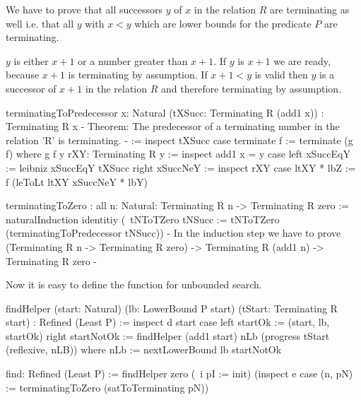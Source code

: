 We have to prove that all successors $y$ of $x$ in the relation $R$ are
terminating as well i.e. that all $y$ with $x < y$ which are lower bounds for
the predicate $P$ are terminating.

$y$ is either $x + 1$ or a number greater than $x + 1$. If $y$ is $x + 1$ we are
ready, because $x + 1$ is terminating by assumption. If $x + 1 < y$ is valid
then $y$ is a successor of $x + 1$ in the relation $R$ and therefore terminating
by assumption.
%
\begin{alba}
    terminatingToPredecessor
        {x: Natural}
        (tXSucc: Terminating R (add1 x))
        : Terminating R x
    {- Theorem: The predecessor of a terminating number in the relation 'R'
       is terminating. -}
    :=
        inspect tXSucc case
            terminate f :=
                terminate (g f)
        where
            g f {y} rXY: Terminating R y :=
                inspect add1 x = y case
                    left xSuccEqY :=
                        leibniz xSuccEqY tXSucc
                    right xSuccNeY :=
                        inspect rXY case
                            ltXY * lbZ :=
                                f (leToLt ltXY xSuccNeY * lbY)

    terminatingToZero
        : all {n: Natural}: Terminating R n -> Terminating R zero
    :=
        naturalInduction
            identitiy
            (\ tNToTZero tNSucc :=
                tNToTZero (terminatingToPredecessor tNSucc))
        {- In the induction step we have to prove
            (Terminating R n -> Terminating R zero)
            -> Terminating R (add1 n) -> Terminating R zero
        -}
\end{alba}

Now it is easy to define the function for unbounded search.

\begin{alba}
    findHelper
        (start: Natural)
        (lb: LowerBound P start)
        (tStart: Terminating R start)
        : Refined (Least P)
    :=
        inspect d start case
            left startOk :=
                (start, lb, startOk)
            right startNotOk :=
                findHelper
                    (add1 start)
                    nLb
                    (progress tStart (reflexive, nLB))
                where
                    nLb := nextLowerBound lb startNotOk

    find: Refined (Least P) :=
        findHelper
            zero
            (\ i pI := init)
            (inspect e case
                (n, pN) :=
                    terminatingToZero (satToTerminating pN))
\end{alba}

